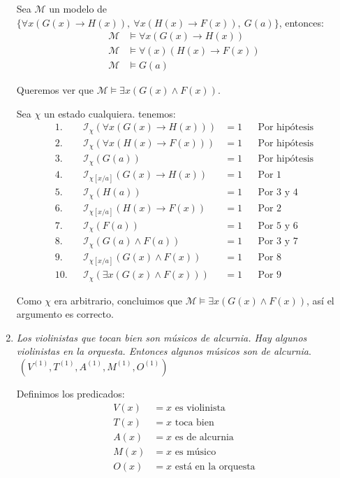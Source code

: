 \documentclass[8pt, letterpaper]{article}
\newcommand{\m}{\mathcal{M} }
\newcommand{\I}{\mathcal{I} }
\begin{document}
\begin{enumerate}
  \hfill\break
  Sea $\m$ un modelo de $\{\forall x(G(x)\rightarrow H(x)),\ 
  \forall x(H(x)\rightarrow F(x)),\ G(a)\}$, entonces:
  \begin{align*}
    \m &\models \forall x(G(x)\rightarrow H(x))\\
    \m &\models \forall(x)(H(x)\rightarrow F(x))\\
    \m &\models G(a)
  \end{align*}
  
  Queremos ver que $\m \models \exists x(G(x) \land F(x))$.

  \hfill\break
  Sea $\chi$ un estado cualquiera. tenemos:
  \begin{align*}
    1.& & \I_\chi(\forall x(G(x)\rightarrow H(x))) &= 1 & &\text{Por
      hipótesis}\\
    2.& & \I_\chi(\forall x(H(x)\rightarrow F(x))) &= 1 & &\text{Por
      hipótesis}\\
    3.& & \I_\chi(G(a)) &= 1 & &\text{Por
      hipótesis}\\
    4.& & \I_{\chi[x/a]}(G(x)\rightarrow H(x)) &= 1 & &\text{Por $1$}\\
    5.& & \I_\chi(H(a)) &= 1 & &\text{Por $3$ y $4$}\\
    6.& & \I_{\chi[x/a]}(H(x)\rightarrow F(x)) &= 1 & &\text{Por $2$}\\
    7.& & \I_\chi(F(a)) &= 1 & &\text{Por $5$ y $6$}\\
    8.& & \I_{\chi}(G(a)\land F(a)) &= 1 & &\text{Por $3$ y $7$}\\
    9.& & \I_{\chi [x/a]}(G(x)\land F(x)) &= 1 & &\text{Por $8$}\\
    10.& & \I_\chi(\exists x(G(x) \land F(x))) &= 1 & &\text{Por $9$}
  \end{align*}

  Como $\chi$ era arbitrario, concluimos que
  $\m \models \exists x(G(x) \land F(x))$, así el argumento es correcto.

  \newpage
\item \textit{Los violinistas que tocan bien son músicos de alcurnia. Hay
  algunos violinistas en la orquesta. Entonces algunos músicos son de
  alcurnia}.\rmfamily $\ (V^{(1)}, T^{(1)}, A^{(1)}, M^{(1)}, O^{(1)})$

  \hfill\break
  Definimos los predicados:
  \begin{align*}
    V(x) &= x \text{ es violinista}\\
    T(x) &= x \text{ toca bien}\\
    A(x) &= x \text{ es de alcurnia}\\
    M(x) &= x \text{ es músico}\\
    O(x) &= x \text{ está en la orquesta}\\
  \end{align*}
  

\end{enumerate}
\end{document}
